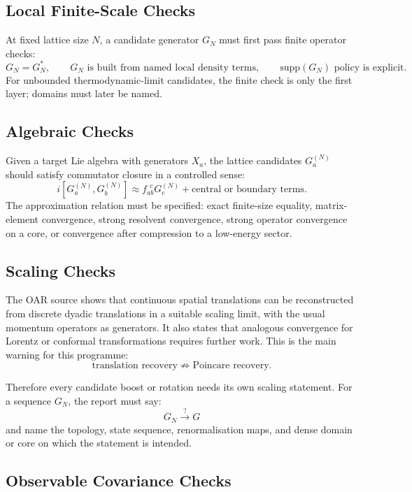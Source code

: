 \subsection{Local Finite-Scale Checks}

At fixed lattice size \(N\), a candidate generator \(G_N\) must first pass
finite operator checks:
\[
  G_N=G_N^*,\qquad
  G_N\text{ is built from named local density terms},\qquad
  \mathrm{supp}(G_N)\text{ policy is explicit}.
\]
For unbounded thermodynamic-limit candidates, the finite check is only the
first layer; domains must later be named.

\subsection{Algebraic Checks}

Given a target Lie algebra with generators \(X_a\), the lattice candidates
\(G_a^{(N)}\) should satisfy commutator closure in a controlled sense:
\[
  i[G_a^{(N)},G_b^{(N)}]
  \approx
  f_{ab}^{\ \ c}G_c^{(N)}+\text{central or boundary terms}.
\]
The approximation relation must be specified: exact finite-size equality,
matrix-element convergence, strong resolvent convergence, strong operator
convergence on a core, or convergence after compression to a low-energy sector.

\subsection{Scaling Checks}

The OAR source shows that continuous spatial translations can be reconstructed
from discrete dyadic translations in a suitable scaling limit, with the usual
momentum operators as generators.  It also states that analogous convergence
for Lorentz or conformal transformations requires further work.  This is the
main warning for this programme:
\[
  \text{translation recovery}\not\Rightarrow
  \text{Poincare recovery}.
\]

Therefore every candidate boost or rotation needs its own scaling statement.
For a sequence \(G_N\), the report must say:
\[
  G_N \xrightarrow{\ ?\ } G
\]
and name the topology, state sequence, renormalisation maps, and dense domain or
core on which the statement is intended.

\subsection{Observable Covariance Checks}


